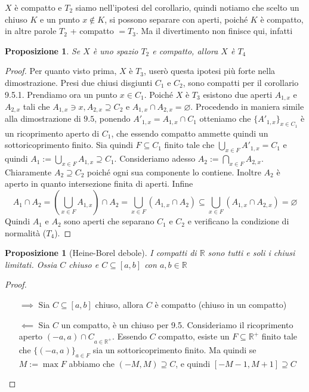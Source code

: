 \documentclass{article}
\newcounter{theo}[section]\setcounter{theo}{0}
\theoremstyle{plain}
\newtheorem{proposition}[theo]{Proposizione}
\theoremstyle{definition}
\theoremstyle{remark}
\begin{document}
\(X\) è compatto e \(T_{2}\) siamo nell'ipotesi del corollario, quindi
notiamo che scelto un chiuso \(K\) e un punto \(x \not\in K\), si possono
separare con aperti, poiché \(K\) è compatto, in altre parole \(T_{2}\) +
compatto \(= T_{3}\). Ma il divertimento non finisce qui, infatti
\begin{proposition}
    Se \(X\) è uno spazio \(T_{2}\) e compatto, allora \(X\) è \(T_{4}\) 
\end{proposition}
\begin{proof}
    Per quanto visto prima, \(X\) è \(T_{3}\), userò questa ipotesi più forte
    nella dimostrazione.
    Presi due chiusi disgiunti \(C_{1}\) e \(C_{2}\), sono compatti per il corollario
    9.5.1.
    Prendiamo ora un punto \(x \in C_{1}\). Poiché \(X\) è \(T_{3}\) esistono
    due aperti \(A_{1, x}\) e \(A_{2, x}\) tali che \(A_{1, x} \ni x, A_{2, x}
    \supseteq C_{2} \) e \(A_{1,x} \cap A_{2, x} = \varnothing\). Procedendo in
    maniera simile alla dimostrazione di \(9.5\), ponendo \(A'_{1, x} = A_{1, x}
    \cap C_{1}\) otteniamo che \(\{A'_{1, x}\}_{x \in C_{1}} \) è un
    ricoprimento aperto di \(C_{1}\), che essendo compatto ammette quindi un
    sottoricoprimento finito. Sia quindi \(F \subseteq C_{1} \) finito tale che
    \(\bigcup_{x \in F} A'_{1, x} = C_{1}\) e quindi
    \(A_1 := \bigcup_{x \in F} A_{1, x} \supseteq C_{1} \). Consideriamo adesso
    \(A_{2} := \bigcap_{x \in F} A_{2, x}\). Chiaramente \(A_{2} \supseteq C_{2}
    \) poiché ogni sua componente lo contiene. Inoltre \(A_{2}\) è aperto in
    quanto intersezione finita di aperti. Infine
    \[
        A_{1} \cap A_{2} = \left( \bigcup_{x \in F} A_{1, x} \right) \cap A_{2}
        = \bigcup_{x \in F} \left( A_{1, x} \cap A_{2} \right) \subseteq
        \bigcup_{x \in F} \left( A_{1, x} \cap A_{2, x} \right) = \varnothing
    \]
    Quindi \(A_{1}\) e \(A_{2}\) sono aperti che separano \(C_{1}\) e \(C_{2}\)
    e verificano la condizione di normalità (\(T_{4}\)).
\end{proof}
\begin{proposition}[Heine-Borel debole]
    I compatti di \(\mathbb{R}\) sono tutti e soli i chiusi limitati. Ossia
    \(C\) chiuso e \(C \subseteq [a, b] \) con \(a, b \in \mathbb{R}\) 
\end{proposition}
\begin{proof}\( \)
\begin{itemize}
    \item[\(\implies \)] Sia \(C \subseteq [a, b] \) chiuso, allora \(C\) è
        compatto (chiuso in un compatto)
    \item[\(\impliedby \)] Sia \(C\) un compatto, è un chiuso per 9.5. Consideriamo il ricoprimento
        aperto \({(-a, a) \cap C}_{a \in \mathbb{R}^{+}}\). Essendo \(C\)
        compatto, esiste un \(F \subseteq \mathbb{R}^{+} \) finito tale che
        \(\{(-a, a)\}_{a \in F}\) sia un sottoricoprimento finito. Ma quindi se
        \(M := \max F\) abbiamo che \((-M, M) \supseteq C \), e quindi \([-M-1,
        M+1] \supseteq C \) 
\end{itemize}
\end{proof}
\end{document}
